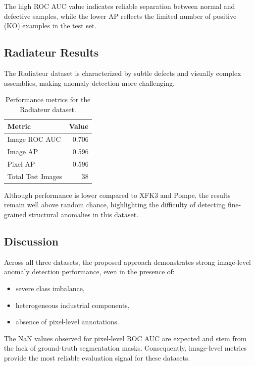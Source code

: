 \documentclass{article}
\begin{document}
The high ROC AUC value indicates reliable separation between normal and defective samples, while the lower AP reflects the limited number of positive (KO) examples in the test set.

\subsection{Radiateur Results}

The Radiateur dataset is characterized by subtle defects and visually complex assemblies, making anomaly detection more challenging.

\begin{table}[htbp]
    \centering
    \begin{tabular}{l r}
        \hline
        \textbf{Metric} & \textbf{Value} \\
        \hline
        Image ROC AUC & 0.706 \\
        Image AP & 0.596 \\
        Pixel AP & 0.596 \\
        Total Test Images & 38 \\
        \hline
    \end{tabular}
    \caption{Performance metrics for the Radiateur dataset.}
    \label{tab:radiateur_results}
\end{table}

Although performance is lower compared to XFK3 and Pompe, the results remain well above random chance, highlighting the difficulty of detecting fine-grained structural anomalies in this dataset.

\subsection{Discussion}

Across all three datasets, the proposed approach demonstrates strong image-level anomaly detection performance, even in the presence of:
\begin{itemize}
    \item severe class imbalance,
    \item heterogeneous industrial components,
    \item absence of pixel-level annotations.
\end{itemize}

The NaN values observed for pixel-level ROC AUC are expected and stem from the lack of ground-truth segmentation masks. Consequently, image-level metrics provide the most reliable evaluation signal for these datasets.
\end{document}
